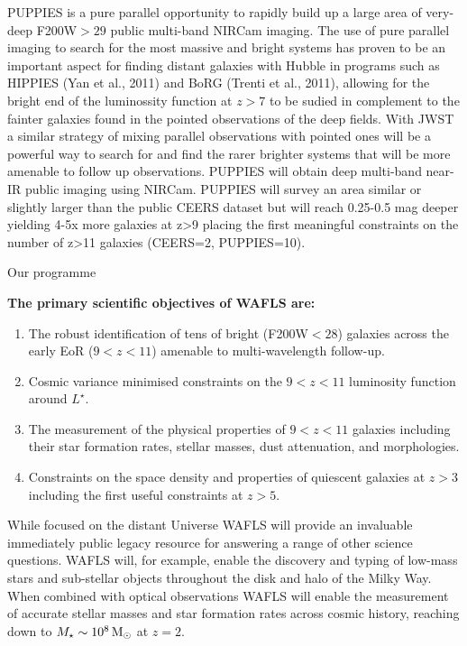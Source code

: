 \documentclass[12pt]{article}
\begin{document}
PUPPIES is a pure parallel opportunity to rapidly build up a large area of very-deep F200W$>29$ public multi-band NIRCam imaging.   The use of pure parallel imaging to search for the most massive and bright systems has proven to be an important aspect for finding distant galaxies with Hubble in programs such as HIPPIES (Yan et al., 2011) and BoRG (Trenti et al., 2011), allowing for the bright end of the luminossity function at $z > 7$ to be sudied in complement to the fainter galaxies found in the pointed observations of the deep fields.  With JWST a similar strategy of mixing parallel observations with pointed ones will be a powerful way to search for and find the rarer brighter systems that will be more amenable to follow up observations.   PUPPIES will obtain deep multi-band near-IR public imaging using NIRCam. PUPPIES will survey an area similar or slightly larger than the public CEERS dataset but will reach 0.25-0.5 mag deeper yielding 4-5x more galaxies at z>9 placing the first meaningful constraints on the number of z>11 galaxies (CEERS=2, PUPPIES=10).

Our programme



\noindent
\textbf{The primary scientific objectives of WAFLS are:}
\vspace{-1mm}
\begin{enumerate}
\item The robust identification of tens of bright (F200W$<28$) galaxies across the early EoR ($9<z<11$) amenable to multi-wavelength follow-up.
\item Cosmic variance minimised constraints on the $9<z<11$ luminosity function around $L^{\star}$.
\item The measurement of the physical properties of $9<z<11$ galaxies including their star formation rates, stellar masses, dust attenuation, and morphologies. 
\item Constraints on the space density and properties of quiescent galaxies at $z>3$ including the first useful constraints at $z>5$.
\end{enumerate}

While focused on the distant Universe WAFLS will provide an invaluable immediately public legacy resource for answering a range of other science questions. WAFLS will, for example, enable the discovery and typing of low-mass stars and sub-stellar objects throughout the disk and halo of the Milky Way. When combined with optical observations WAFLS will enable the measurement of accurate stellar masses and star formation rates across cosmic history, reaching down to $M_{\star}\sim 10^{8}\,{\rm M_{\odot}}$ at $z=2$.
\end{document}
